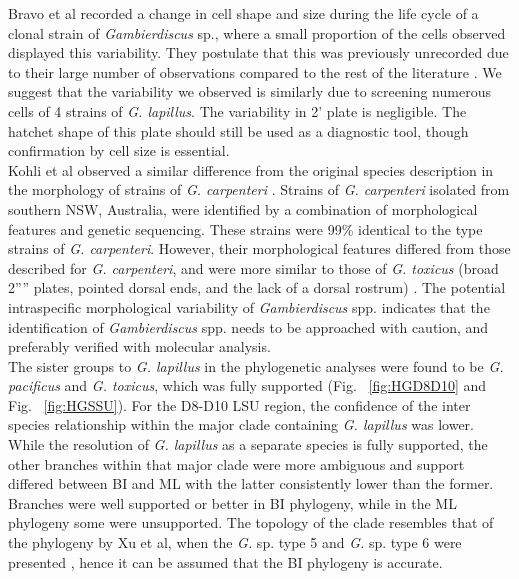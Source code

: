 \documentclass[12pt]{article}
\begin{document}
Bravo et al recorded a change in cell shape and size during the life cycle of a clonal strain of \emph{Gambierdiscus} sp., where a small proportion of the cells observed displayed this variability. 
They postulate that this was previously unrecorded due to their large number of observations compared to the rest of the literature \citep{bravo2014cellular}. 
We suggest that the variability we observed is similarly due to screening numerous cells of 4 strains of \emph{G. lapillus}. 
The variability in 2' plate is negligible. The hatchet shape of this plate should still be used as a diagnostic tool, though confirmation by cell size is essential.\\
Kohli et al observed a similar difference from the original species description in the morphology of strains of  \emph{G. carpenteri} \citep{kohli2014high}. 
Strains of \emph{G. carpenteri} isolated from southern NSW, Australia, were identified by a combination of morphological features and genetic sequencing. These strains were 99\% identical to the type strains of \textit{G. carpenteri}. 
However, their morphological features differed from those described for \textit{G. carpenteri}, and were more similar to those of \emph{G. toxicus} (broad 2'''' plates, pointed dorsal ends, and the lack of a dorsal rostrum) \citep{kohli2014high,litaker2009taxonomy}.
The potential intraspecific morphological variability of \emph{Gambierdiscus} spp. indicates that the identification of \emph{Gambierdiscus} spp. needs to be approached with caution, and preferably verified with molecular analysis.\\
The sister groups to \emph{G. lapillus} in the phylogenetic analyses were found to be \emph{G. pacificus} and \emph{G. toxicus}, 
which was fully supported (Fig. ~\ref{fig:HGD8D10} and Fig. ~\ref{fig:HGSSU}). For the D8-D10 LSU region, the confidence of the inter species relationship within the major clade containing \emph{G. lapillus} was lower.  
While the resolution of \emph{G. lapillus} as a separate species is fully supported, the other branches within that major clade were more ambiguous and support differed between BI and ML with the latter consistently lower than the former. 
Branches were well supported or better in BI phylogeny, while in the ML phylogeny some were unsupported. 
The topology of the clade resembles that of the phylogeny by Xu et al, when the \emph{G.} sp. type 5 and \emph{G.} sp. type 6 were presented \citep{xu2014distribution}, hence it can be assumed that the BI phylogeny is accurate.
\end{document}
